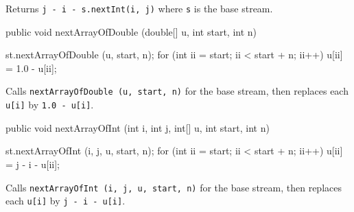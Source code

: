 \begin{tabb} Returns \texttt{j - i - s.nextInt(i, j)} where \texttt{s} is the
  base stream.
\end{tabb}
\begin{code}

   public void nextArrayOfDouble (double[] u, int start, int n) \begin{hide} {
       st.nextArrayOfDouble (u, start, n);
       for (int ii = start; ii < start + n; ii++)
          u[ii] = 1.0 - u[ii];
   }\end{hide}
\end{code} 
\begin{tabb} Calls \texttt{nextArrayOfDouble (u, start, n)} for the base stream,
  then replaces each \texttt{u[i]} by \texttt{1.0 - u[i]}.
\end{tabb}
\begin{htmlonly}
\end{htmlonly}
\begin{code}

   public void nextArrayOfInt (int i, int j, int[] u, int start, int n) \begin{hide} {
       st.nextArrayOfInt (i, j, u, start, n);
       for (int ii = start; ii < start + n; ii++)
          u[ii] = j - i - u[ii];
   }\end{hide}
\end{code} 
\begin{tabb} Calls \texttt{nextArrayOfInt (i, j, u, start, n)} for the base stream,
  then replaces each \texttt{u[i]} by \texttt{j - i - u[i]}.
\end{tabb}
\begin{htmlonly}
\end{htmlonly}
\begin{code}
\begin{hide}
}
\end{hide}
\end{code}

